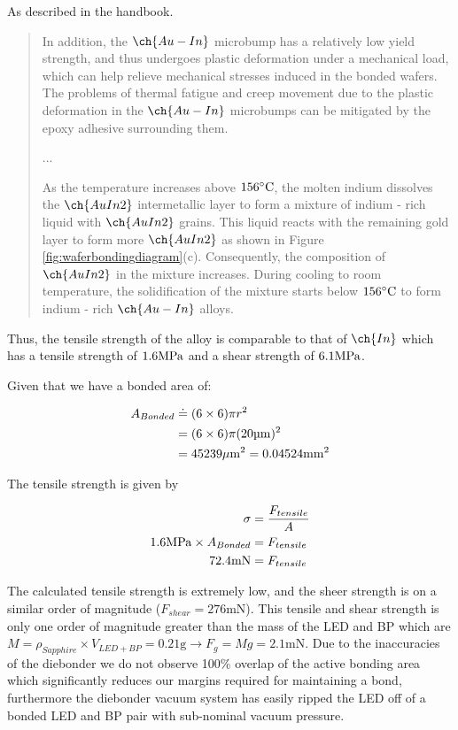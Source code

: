 As described in the handbook.
\begin{quote}
    In addition, the  $\ch{Au - In}$ microbump has a relatively low yield strength, and thus undergoes plastic deformation under a mechanical load, which can help relieve mechanical stresses induced in the bonded wafers. The problems of thermal fatigue and creep movement due to the plastic deformation in the  $\ch{Au - In}$ microbumps can be mitigated by the epoxy adhesive surrounding them.

...

    As the temperature increases above $156\dC$, the molten indium dissolves the $\ch{AuIn2}$ intermetallic layer to form a mixture of indium - rich liquid with $\ch{AuIn2}$ grains. This liquid reacts with the remaining gold layer to form more $\ch{AuIn2}$ as shown in Figure \ref{fig:waferbondingdiagram}(c). Consequently, the composition of $\ch{AuIn2}$ in the mixture increases. During cooling to room temperature, the solidification of the mixture starts below $156\dC$ to form indium - rich $\ch{Au - In}$ alloys.
\end{quote}

Thus, the tensile strength of the alloy is comparable to that of $\ch{In}$ which has a tensile strength of $1.6 \mpa$ \cite{indiumCorpConstants} and a shear strength of $6.1 \mpa$.

Given that we have a bonded area of:


\begin{equation} \label{eq:bonded_area}
    \begin{split}
        A_{Bonded} &\doteq (6\times 6) \pi r^2 \\
        &= (6\times 6) \pi (20 \um)^2 \\
        &= 45239 \umm = 0.04524 \mm^2
    \end{split}
\end{equation}

The tensile strength is given by

\begin{equation} \notag
    \begin{split}
        \sigma &= \frac{F_{tensile}}{A} \\
        1.6 \mpa \times A_{Bonded} &= F_{tensile} \\
        72.4 \unit{\milli\newton} &= F_{tensile}
    \end{split}
\end{equation}

The calculated tensile strength is extremely low, and the sheer strength is on a similar order of magnitude ($F_{shear} = 276 \unit{\milli\newton}$). This tensile and shear strength is only one order of magnitude greater than the mass of the LED and BP which are $M = \rho_{Sapphire} \times V_{LED + BP} = 0.21 \unit{\gram} \rightarrow F_{g} = M g = 2.1 \unit{\milli\newton}$. Due to the inaccuracies of the diebonder we do not observe 100\% overlap of the active bonding area which significantly reduces our margins required for maintaining a bond, furthermore the diebonder vacuum system has easily ripped the LED off of a bonded LED and BP pair with sub-nominal vacuum pressure.

